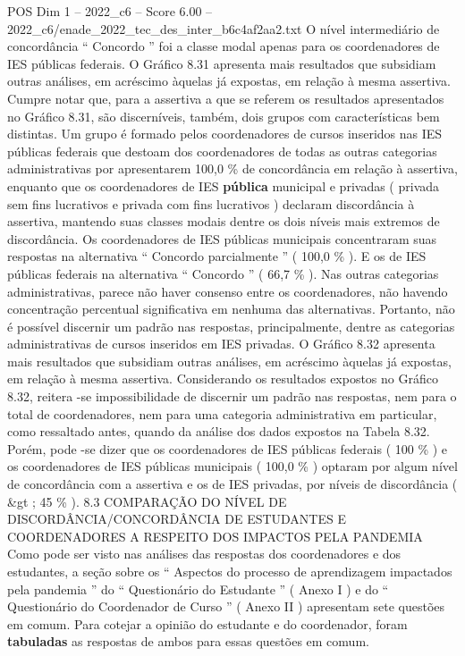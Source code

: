 \begin{textsample}{POS Dim 1 – 2022\_c6 – Score 6.00 – 2022\_c6/enade\_2022\_tec\_des\_inter\_b6c4af2aa2.txt}
O nível intermediário de concordância “ Concordo ” foi a classe modal apenas para os coordenadores de IES públicas federais.
O Gráfico 8.31 apresenta mais resultados que subsidiam outras análises, em acréscimo àquelas já expostas, em relação à mesma assertiva.
Cumpre notar que, para a assertiva a que se referem os resultados apresentados no Gráfico 8.31, são discerníveis, também, dois grupos com características bem distintas.
Um grupo é formado pelos coordenadores de cursos inseridos nas IES públicas federais que destoam dos coordenadores de todas as outras categorias administrativas por apresentarem 100,0 \% de concordância em relação à assertiva, enquanto que os coordenadores de IES \textbf{pública} municipal e privadas ( privada sem fins lucrativos e privada com fins lucrativos ) declaram discordância à assertiva, mantendo suas classes modais dentre os dois níveis mais extremos de discordância.
Os coordenadores de IES públicas municipais concentraram suas respostas na alternativa “ Concordo parcialmente ” ( 100,0 \% ).
E os de IES públicas federais na alternativa “ Concordo ” ( 66,7 \% ).
Nas outras categorias administrativas, parece não haver consenso entre os coordenadores, não havendo concentração percentual significativa em nenhuma das alternativas.
Portanto, não é possível discernir um padrão nas respostas, principalmente, dentre as categorias administrativas de cursos inseridos em IES privadas.
O Gráfico 8.32 apresenta mais resultados que subsidiam outras análises, em acréscimo àquelas já expostas, em relação à mesma assertiva.
Considerando os resultados expostos no Gráfico 8.32, reitera -se impossibilidade de discernir um padrão nas respostas, nem para o total de coordenadores, nem para uma categoria administrativa em particular, como ressaltado antes, quando da análise dos dados expostos na Tabela 8.32.
Porém, pode -se dizer que os coordenadores de IES públicas federais ( 100 \% ) e os coordenadores de IES públicas municipais ( 100,0 \% ) optaram por algum nível de concordância com a assertiva e os de IES privadas, por níveis de discordância ( \&gt ; 45 \% ). 8.3 COMPARAÇÃO DO NÍVEL DE DISCORDÂNCIA/CONCORDÂNCIA DE ESTUDANTES E COORDENADORES A RESPEITO DOS IMPACTOS PELA PANDEMIA Como pode ser visto nas análises das respostas dos coordenadores e dos estudantes, a seção sobre os “ Aspectos do processo de aprendizagem impactados pela pandemia ” do “ Questionário do Estudante ” ( Anexo I ) e do “ Questionário do Coordenador de Curso ” ( Anexo II ) apresentam sete questões em comum.
Para cotejar a opinião do estudante e do coordenador, foram \textbf{tabuladas} as respostas de ambos para essas questões em comum.

\end{textsample}
